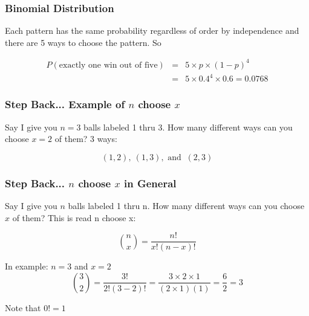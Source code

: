 \documentclass[handout]{beamer}
\newcommand{\blue}[1]{\textcolor{blue2}{#1}}
\begin{document}
\begin{frame}
\frametitle{Binomial Distribution}

%
%
Each pattern has the same probability regardless of order by independence and there are 5 ways to \blue{choose} the pattern.  So

\vspace{0.25cm}

\begin{eqnarray*}
P(\mbox{exactly one win out of five}) &=& 5 \times p\times(1-p)^4\\
&=& 5 \times 0.4^4 \times 0.6 = 0.0768
\end{eqnarray*}

\end{frame}



\begin{frame}
\frametitle{Step Back... Example of $n$ choose $x$}
Say I give you $n=3$ balls labeled 1 thru 3.  How many different ways can you choose $x=2$ of them?  3 ways:

\[
(1, 2), \ (1, 3), \mbox{ and } \ (2, 3)
\]

\end{frame}



\begin{frame}
\frametitle{Step Back... $n$ choose $x$ in General}

%
%
Say I give you $n$ balls labeled 1 thru n.  How many different ways can you choose $x$ of them?  This is read \blue{n choose x}:

\[
{n \choose x} = \frac{n!}{x!(n-x)!}
\] 

\vspace{0.5cm}

In example: $n=3$ and $x=2$
\[
{3 \choose 2} = \frac{3!}{2!(3-2)!} = \frac{3 \times 2 \times 1}{(2 \times 1)(1)} = \frac{6}{2} = 3
\]

Note that $0!=1$

\end{frame}
\end{document}
